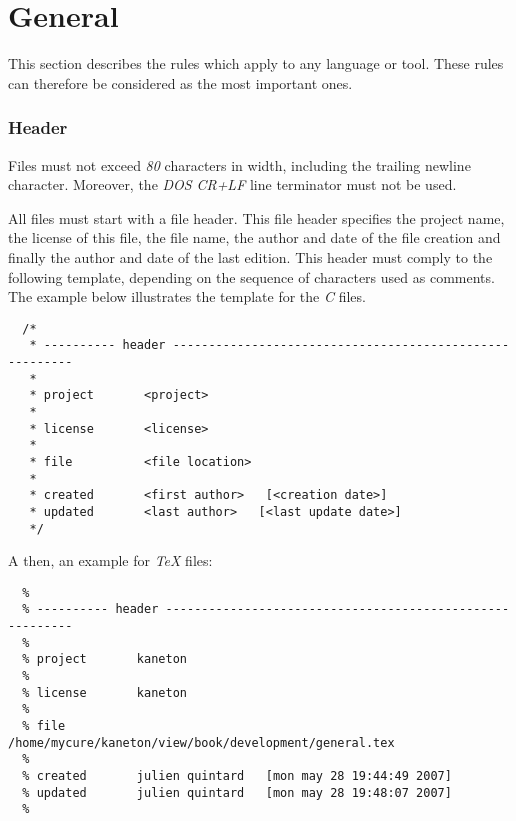 %
%
%
%
%
%

%
%

\section{General}

This section describes the rules which apply to any language or tool. These
rules can therefore be considered as the most important ones.


\subsubsection{Header}

Files must not exceed \textit{80} characters in width, including
the trailing newline character. Moreover, the \textit{DOS} \textit{CR+LF}
line terminator must not be used.

All files must start with a file header. This file header specifies the
project name, the license of this file, the file name, the author and
date of the file creation and finally the author and date of the last
edition. This header must comply to the following template, depending
on the sequence of characters used as comments. The example below illustrates
the template for the \textit{C} files.

\begin{verbatim}
  /*
   * ---------- header --------------------------------------------------------
   *
   * project       <project>
   *
   * license       <license>
   *
   * file          <file location>
   *
   * created       <first author>   [<creation date>]
   * updated       <last author>   [<last update date>]
   */
\end{verbatim}

A then, an example for \textit{TeX} files:

\begin{verbatim}
  %
  % ---------- header ---------------------------------------------------------
  %
  % project       kaneton
  %
  % license       kaneton
  %
  % file          /home/mycure/kaneton/view/book/development/general.tex
  %
  % created       julien quintard   [mon may 28 19:44:49 2007]
  % updated       julien quintard   [mon may 28 19:48:07 2007]
  %
\end{verbatim}

